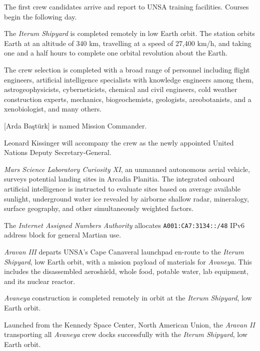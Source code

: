 The first crew candidates arrive and report to UNSA training facilities. Courses begin the following day.
\StopTimelineDate

The {\it Iterum Shipyard} is completed remotely in low Earth orbit. The station orbits Earth at an altitude of 340 km, travelling at a speed of 27,400 km/h, and taking one and a half hours to complete one orbital revolution about the Earth.
\StopTimelineDate

The crew selection is completed with a broad range of personnel including flight engineers, artificial intelligence specialists with knowledge engineers among them, astrogeophysicists, cyberneticists, chemical and civil engineers, cold weather construction experts, mechanics, biogeochemists, geologists, areobotanists, and a xenobiologist, and many others. 

[Arda Baştürk] is named Mission Commander. 

Leonard Kissinger will accompany the crew as the newly appointed United Nations Deputy Secretary-General.
\StopTimelineDate

{\it Mars Science Laboratory Curiosity XI}, an unmanned autonomous aerial vehicle, surveys potential landing sites in Arcadia Planitia. The integrated onboard artificial intelligence is instructed to evaluate sites based on average available sunlight, underground water ice revealed by airborne shallow radar, mineralogy, surface geography, and other simultaneously weighted factors.
\StopTimelineDate

The {\it Internet Assigned Numbers Authority} allocates {\tt A001:CA7:3134::/48} IPv6 address block for general Martian use. 
\StopTimelineDate

{\it Aravan III} departs UNSA's Cape Canaveral launchpad en-route to the {\it Iterum Shipyard}, low Earth orbit, with a mission payload of materials for {\it Avaneya}. This includes the disassembled aeroshield, whole food, potable water, lab equipment, and its nuclear reactor.
\StopTimelineDate

{\it Avaneya} construction is completed remotely in orbit at the {\it Iterum Shipyard}, low Earth orbit.
\StopTimelineDate

Launched from the Kennedy Space Center, North American Union, the {\it Aravan II} transporting all {\it Avaneya} crew docks successfully with the {\it Iterum Shipyard}, low Earth orbit.
\StopTimelineDate

